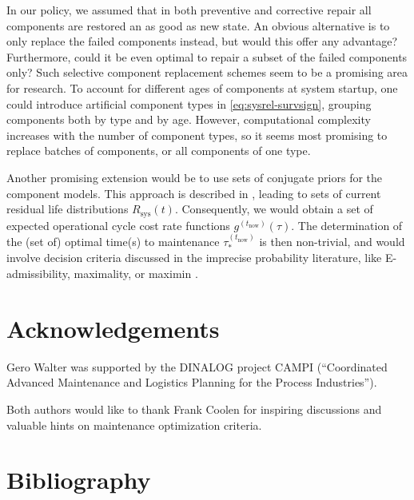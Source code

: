 \documentclass[authoryear]{elsarticle}
\renewcommand{\vec}[1]{{\bm#1}}
\newcommand{\uz}{^{(0)}} %
\newcommand{\Rsys}{R_\text{sys}}
\def\ykz{y\uz_k}
\def\nkz{n\uz_k}
\def\tnow{t_\text{now}}
\newcommand{\Rsysnow}{R^{(t_\text{now})}_\text{sys}}
\def\vectknow{\vec{t}_k^{(\tnow)}}
\newcommand{\gnow}{g^{(\tnow)}}
\newcommand{\tausnow}{\tau_*^{(\tnow)}}
\begin{document}
In our policy, we assumed that in both preventive and corrective repair
all components are restored an as good as new state.
An obvious alternative is to only replace the failed components instead,
but would this offer any advantage?
Furthermore, could it be even optimal to repair a subset of the failed components only?
Such selective component replacement schemes
seem to be a promising area for research.
To account for different ages of components at system startup,
one could introduce artificial component types in \eqref{eq:sysrel-survsign},
grouping components both by type and by age.
However, computational complexity increases with the number of component types,
so it seems most promising to replace batches of components,
or all components of one type.

Another promising extension would be to use sets of conjugate priors for the component models.
This approach is described in \cite{2016:walter-coolen},
leading to sets of current residual life distributions $\Rsys(t)$.
Consequently, we would obtain a set of expected operational cycle cost rate functions $\gnow(\tau)$.
The determination of the (set of) optimal time(s) to maintenance $\tausnow$
is then non-trivial,
and would involve decision criteria discussed in the imprecise probability literature,
like E-admissibility, maximality, or maximin \citep[see, e.g., \S 8][]{itip}.


\section*{Acknowledgements}

Gero Walter was supported by the DINALOG project CAMPI
(``Coordinated Advanced Maintenance and Logistics Planning for the Process Industries'').

Both authors would like to thank Frank Coolen for inspiring discussions
and valuable hints on maintenance optimization criteria.

\section*{Bibliography}




\end{document}

